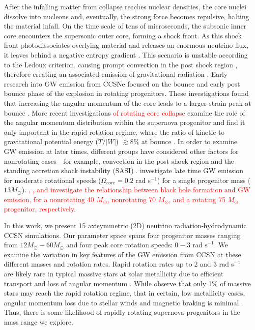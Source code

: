 \documentclass[twocolumn,times]{aastex62}  %
\begin{document}
After the infalling matter from collapse reaches nuclear densities, the core nuclei dissolve into nucleons and, eventually, the strong force becomes repulsive, halting the material infall.  On the time scale of tens of microseconds, the subsonic inner core encounters the supersonic outer core, forming a shock front.  As this shock front photodissociates overlying material and releases an enormous neutrino flux, it leaves behind a negative entropy gradient \citep{mazurek:1982,bruenn:1985,bruenn:1989}.  This scenario is unstable according to the Ledoux criterion, causing prompt convection in the post shock region \citep{burrows:1992}, therefore creating an associated emission of gravitational radiation \citep{marek:2009b,ott:2009}.  Early research into GW emission from CCSNe focused on the bounce and early post bounce phase of the explosion in rotating progenitors.
These investigations found that increasing the angular momentum of the core leads to a larger strain peak at bounce \citep{muller:1982,moench:1991,yamada:1995,zwerger:1997,dimm:2002,kotake:2003,shibata:2004}.  
More recent investigations \textcolor{red}{of rotating core collapse} examine the role of the angular momentum distribution within the supernova progenitor and find it only important in the rapid rotation regime, where the ratio of kinetic to gravitational potential energy ($T/|W|$) $ \gtrsim 8\%$ at bounce \citep{abdik:2014}. In order to examine GW emission at later times, different groups have considered other factors for nonrotating cases---for example, convection in the post shock region \citep{burrows:1996,muller:1997,muller:2004,murphy:2009,marek:2009b} and the standing accretion shock instability (SASI) \citep{blondin:2003,blondin:2006,ohnishi:2006,foglizzo:2007,scheck:2008,iwakami:2009,fernandez:2010}.  \citet{moro:2018} investigate late time GW emission for moderate rotational speeds ($\Omega_{core} = 0.2$ rad s$^{-1}$) for a single progenitor mass ($13 M_\odot$).  \textcolor{red}{\citet{pan:2018}, \citet{kuroda:2018}, and \citet{ott:2011} investigate the relationship between black hole formation and GW emission, for a nonrotating 40 $M_\odot$, nonrotating  70 $M_\odot$, and  a rotating 75 $M_\odot$ progenitor, respectively}.
 

In this work, we present 15 axisymmetric (2D) neutrino radiation-hydrodynamic CCSN simulations.  
Our parameter space spans four progenitor masses ranging from $12M_\odot-60M_\odot$ \citep{Suk:2016} and four peak core rotation speeds: $0-3 \text{ rad s}^{-1}$.  
We examine the variation in key features of the GW emission from CCSN at these different masses and rotation rates.
Rapid rotation rates up to 2 and 3 rad s$^{-1}$ are likely rare in typical massive stars at solar metallicity due to efficient transport and loss of angular momentum \citep{heger:2005}.
While \citet{woosley:2006} observe that only 1\% of massive stars may reach the rapid rotation regime, that in certain, low metallicity cases, angular momentum loss due to stellar winds and magnetic braking is minimal \citep{yoon:2005}.  Thus, there is some likelihood of rapidly rotating supernova progenitors in the mass range we explore.  
\end{document}
